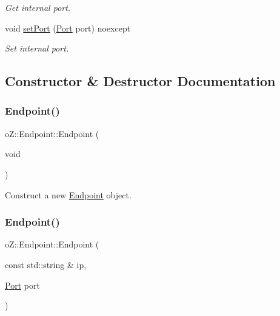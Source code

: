 \begin{DoxyCompactItemize}
\begin{DoxyCompactList}\small\item\em Get internal port. \end{DoxyCompactList}\item 
void \mbox{\hyperlink{classo_z_1_1_endpoint_a2f7fda5ee5e4645a8b9a55de9e534f1a}{set\+Port}} (\mbox{\hyperlink{namespaceo_z_afeccb82d451972ba3b7d2a32b066b30b}{Port}} port) noexcept
\begin{DoxyCompactList}\small\item\em Set internal port. \end{DoxyCompactList}\end{DoxyCompactItemize}


\subsection{Constructor \& Destructor Documentation}
\mbox{\label{classo_z_1_1_endpoint_aa0e46ff6f1b744e9173a97680e2e20a6}} 
\subsubsection{\texorpdfstring{Endpoint()}{Endpoint()}\hspace{0.1cm}{\footnotesize\ttfamily [1/4]}}
{\footnotesize\ttfamily o\+Z\+::\+Endpoint\+::\+Endpoint (\begin{DoxyParamCaption}\item[{void}]{ }\end{DoxyParamCaption})\hspace{0.3cm}{\ttfamily [default]}}



Construct a new \mbox{\hyperlink{classo_z_1_1_endpoint}{Endpoint}} object. 

\mbox{\label{classo_z_1_1_endpoint_ac7c25299f3e5bc05a54e7906d17fbfd9}} 
\subsubsection{\texorpdfstring{Endpoint()}{Endpoint()}\hspace{0.1cm}{\footnotesize\ttfamily [2/4]}}
{\footnotesize\ttfamily o\+Z\+::\+Endpoint\+::\+Endpoint (\begin{DoxyParamCaption}\item[{const std\+::string \&}]{ip,  }\item[{\mbox{\hyperlink{namespaceo_z_afeccb82d451972ba3b7d2a32b066b30b}{Port}}}]{port }\end{DoxyParamCaption})\hspace{0.3cm}{\ttfamily [inline]}}



